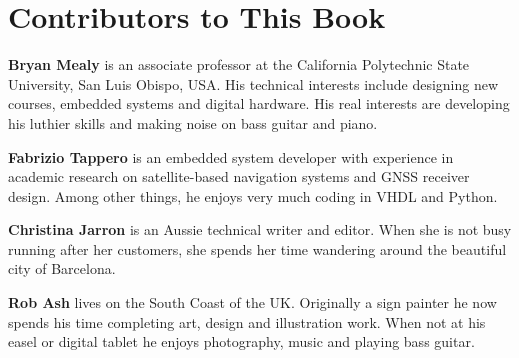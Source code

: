 %
%
\chapter{Contributors to This Book}

\noindent
\textbf{Bryan Mealy} is an associate professor at the California Polytechnic State University, San Luis Obispo, USA. His technical interests include designing new courses, embedded systems and digital hardware. His real interests are developing his luthier skills and making noise on bass guitar and piano.

\noindent
\textbf{Fabrizio Tappero} is an embedded system developer with experience in academic research on satellite-based navigation systems and GNSS receiver design. Among other things, he enjoys very much coding in VHDL and Python.

\noindent
\textbf{Christina Jarron} is an Aussie technical writer and editor. When she is not busy running after her customers, she spends her time wandering around the beautiful city of Barcelona.

\noindent
\textbf{Rob Ash} lives on the South Coast of the UK. Originally a sign painter he now spends his time completing art, design and illustration work. When not at his easel or digital tablet he enjoys photography, music and playing bass guitar.
